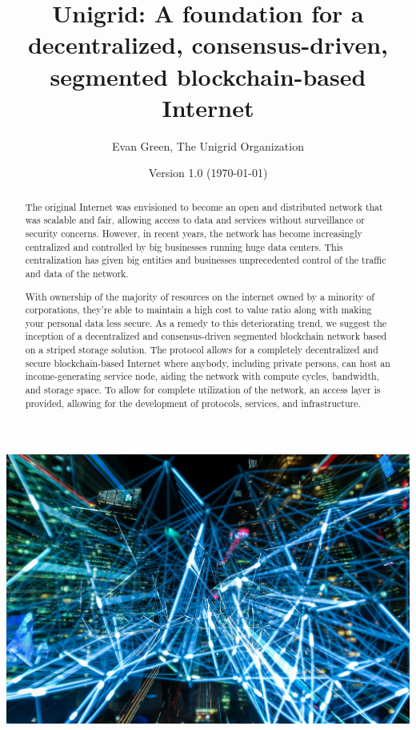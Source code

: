 \documentclass[12pt]{article}
\author{Evan Green, The Unigrid Organization}
\title{Unigrid: A foundation for a decentralized, consensus-driven, segmented blockchain-based Internet}
\date{Version 1.0 (\today)}
\begin{document}
\maketitle


\newpage
\thispagestyle{fancy}

\begin{abstract}
The original Internet was envisioned to become an open and distributed network that was scalable and fair, allowing access to data and services without surveillance or security concerns. However, in recent years, the network has become increasingly centralized and controlled by big businesses running huge data centers. This centralization has given big entities and businesses unprecedented control of the traffic and data of the network.

With ownership of the majority of resources on the internet owned by a minority of corporations, they're able to maintain a high cost to value ratio along with making your personal data less secure. As a remedy to this deteriorating trend, we suggest the inception of a decentralized and consensus-driven segmented blockchain network based on a striped storage solution. The protocol allows for a completely decentralized and secure blockchain-based Internet where anybody, including private persons, can host an income-generating service node, aiding the network with compute cycles, bandwidth, and storage space. To allow for complete utilization of the network, an access layer is provided, allowing for the development of protocols, services, and infrastructure.

\end{abstract}

\includegraphics[scale=0.12]{lights}
\end{document}

